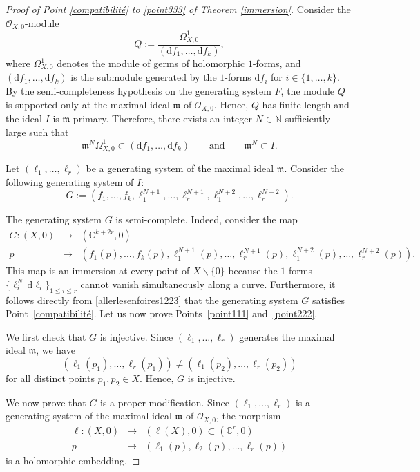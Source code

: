 \documentclass[reqno,dvipsnames,12pt]{amsart}
\renewcommand{\setminus}{\smallsetminus}
\begin{document}
\begin{proof}[Proof of Point \ref{compatibilité} to \ref{point333} of Theorem \ref{immersion}]
Consider the $\mathcal{O}_{X,0}$-module
\[
Q := \frac{\Omega^1_{X,0}}{(\mathrm{d}f_1,\dots,\mathrm{d}f_k)},
\]
where $\Omega^1_{X,0}$ denotes the module of germs of holomorphic $1$-forms, and $(\mathrm{d}f_1,\dots,\mathrm{d}f_k)$ is the submodule generated by the $1$-forms $\mathrm{d}f_i$ for $i \in \{1,\dots,k\}$. By the semi-completeness  hypothesis on the generating system $F$, the module $Q$ is supported only at the maximal ideal $\mathfrak{m}$ of $\mathcal{O}_{X,0}$. Hence, $Q$ has finite length and the ideal $I$ is $\mathfrak{m}$-primary. Therefore, there exists an integer $N \in \mathbb{N}$ sufficiently large such that
\begin{equation}\label{allerlesenfoires1223}
    \mathfrak{m}^N \Omega^1_{X,0} \subset (\mathrm{d}f_1,\dots,\mathrm{d}f_k)
    \qquad \text{and} \qquad
    \mathfrak{m}^N \subset I.
\end{equation}

Let $(\ell_1,\dots,\ell_r)$ be a generating system of the maximal ideal $\mathfrak{m}$. Consider the following generating system of $I$:
\[
G := \left(
f_1,\dots,f_k,
\ell_1^{N+1},\dots,\ell_r^{N+1},
\ell_1^{N+2},\dots,\ell_r^{N+2}
\right).
\]

The generating system $G$ is semi-complete. Indeed, consider the map
\[
\begin{array}{rcl}
G:(X,0) &\longrightarrow& (\mathbb{C}^{k+2r},0) \\
p &\longmapsto&
\left(
f_1(p),\dots,f_k(p),
\ell_1^{N+1}(p),\dots,\ell_r^{N+1}(p),
\ell_1^{N+2}(p),\dots,\ell_r^{N+2}(p)
\right).
\end{array}
\]
This map is an immersion at every point of $X \setminus \{0\}$ because the $1$-forms $\{\ell_i^N\,\mathrm{d}\ell_i\}_{1 \leq i \leq r}$
cannot vanish simultaneously along a curve. Furthermore, it follows directly from \eqref{allerlesenfoires1223} that the generating system $G$ satisfies Point~\ref{compatibilité}. Let us now prove Points~\ref{point111} and~\ref{point222}.

We first check that $G$ is injective. Since $(\ell_1,\dots,\ell_r)$ generates the maximal ideal $\mathfrak{m}$, we have
\[
(\ell_1(p_1),\dots,\ell_r(p_1))
\neq
(\ell_1(p_2),\dots,\ell_r(p_2))
\]
for all distinct points $p_1,p_2 \in X$. Hence, $G$ is injective.

We now prove that $G$ is a proper modification. Since $(\ell_1,\dots,\ell_r)$ is a generating system of the maximal ideal $\mathfrak{m}$ of $\mathcal{O}_{X,0}$, the morphism
\[
\begin{array}{rcl}
\ell:(X,0) &\longrightarrow& (\ell(X),0) \subset (\mathbb{C}^r,0) \\
p &\longmapsto&
(\ell_1(p),\ell_2(p),\dots,\ell_r(p))
\end{array}
\]
is a holomorphic embedding.


\end{proof}
\end{document}
